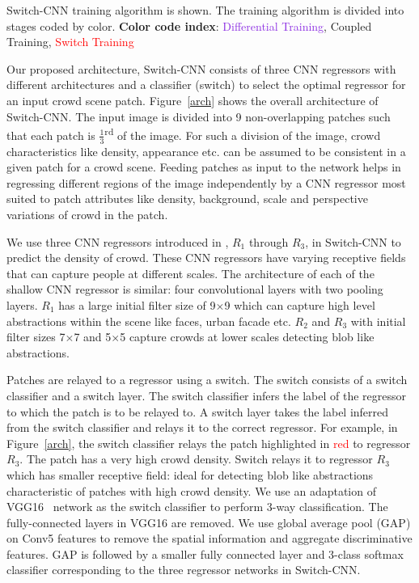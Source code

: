 \documentclass[10pt,twocolumn,letterpaper]{article}
\begin{document}
\begin{algorithm}[!t]
{}

\color{black}
\caption{Switch-CNN training algorithm is shown. The training algorithm is divided into stages coded by color. \textbf{Color code index}: \textcolor{BlueViolet}{Differential Training}, \textcolor{OliveGreen}{Coupled Training}, \textcolor{red}{Switch Training}}
\label{algo}
\end{algorithm}


Our proposed architecture, Switch-CNN consists of three CNN regressors with different architectures and a classifier (switch) to select the optimal regressor for an input crowd scene patch. Figure~\ref{arch} shows the overall architecture of Switch-CNN. The input image is divided into 9 non-overlapping patches such that each patch is $\frac{1}{3}$\textsuperscript{rd} of the image.
For such a division of the image, crowd characteristics like density, appearance etc. can be assumed
to be consistent in a given patch for a crowd scene. Feeding patches as input
to the network helps in regressing different regions of the image
independently by a CNN regressor most suited to patch attributes like density, background, scale and perspective variations of crowd in the patch.

We use three CNN regressors introduced in \cite{zhang2016single}, $R_1$ through $R_3$, in Switch-CNN to predict the density of crowd. These CNN regressors have varying receptive fields that can capture people at
different scales. The architecture of each of the shallow CNN regressor is similar: four convolutional layers
with two pooling layers. $R_1$ has a large initial filter
size of 9$\times$9 which can capture high level abstractions within the scene like faces, urban facade etc. $R_2$ and $R_3$ with initial filter sizes 7$\times$7 and 5$\times$5 capture crowds at lower scales detecting blob like abstractions. 

Patches are relayed to a regressor using a switch. The switch consists of a switch classifier and a switch layer. The switch classifier infers the label of the regressor to which the patch is to be relayed to. A switch layer takes the label inferred from the switch classifier and relays it to the correct regressor. For example, in Figure~\ref{arch}, the switch classifier relays the patch highlighted in \textcolor{red}{red} to regressor $R_3$. The patch has a very high crowd density. Switch relays it to regressor $R_3$ which has smaller receptive field: ideal for detecting blob like abstractions characteristic of patches with high crowd density. We use an adaptation of VGG16~\cite{simonyan2014very} network as the switch classifier to perform 3-way classification. The fully-connected layers in VGG16 are removed.  We use global average pool (GAP) on Conv5 features to remove the spatial information and aggregate discriminative features. GAP is
followed by a smaller fully connected layer and 3-class softmax classifier corresponding to the three regressor networks in Switch-CNN. 
\end{document}
